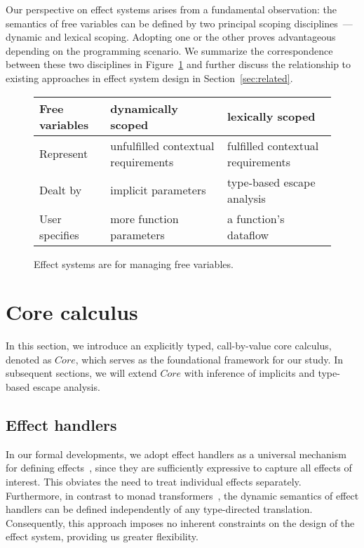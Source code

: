 \documentclass[acmsmall,review,screen]{acmart}
\begin{document}
Our perspective on effect systems arises from a fundamental observation: the semantics of free variables can be defined by two principal scoping disciplines~--- dynamic and lexical scoping.
Adopting one or the other proves advantageous depending on the programming scenario.
We summarize the correspondence between these two disciplines in Figure~\ref{fig:free-vars} and further discuss the relationship to existing approaches in effect system design in Section~\ref{sec:related}.

\begin{figure}
    \centering
    \begin{tabular}{|l|l|l|}
        \hline
        Free variables & dynamically scoped & lexically scoped \\
        \hline
        Represent & unfulfilled contextual requirements & fulfilled contextual requirements \\
        Dealt by & implicit parameters & type-based escape analysis \\
        User specifies & more function parameters & a function’s dataflow \\
        \hline
    \end{tabular}
    \caption{Effect systems are for managing free variables.}
    \label{fig:free-vars}
\end{figure}


\section{Core calculus} \label{sec:core}

In this section, we introduce an explicitly typed, call-by-value core calculus, denoted as $Core$, which serves as the foundational framework for our study.
In subsequent sections, we will extend $Core$ with inference of implicits and type-based escape analysis.

\subsection{Effect handlers} \label{subsec:handlers}

In our formal developments, we adopt effect handlers as a universal mechanism for defining effects~\cite{plotkin2003algebraic, plotkin2013handling}, since they are sufficiently expressive to capture all effects of interest.
This obviates the need to treat individual effects separately.
Furthermore, in contrast to monad transformers~\cite{liang1995monad, schrijvers2019monad}, the dynamic semantics of effect handlers can be defined independently of any type-directed translation.
Consequently, this approach imposes no inherent constraints on the design of the effect system, providing us greater flexibility.
\end{document}
